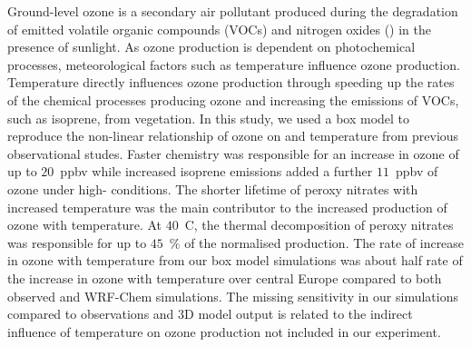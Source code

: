 Ground-level ozone is a secondary air pollutant produced during the degradation of emitted volatile organic compounds (VOCs) and nitrogen oxides () in the presence of sunlight. 
As ozone production is dependent on photochemical processes, meteorological factors such as temperature influence ozone production.
Temperature directly influences ozone production through speeding up the rates of the chemical processes producing ozone and increasing the emissions of VOCs, such as isoprene, from vegetation.
In this study, we used a box model to reproduce the non-linear relationship of ozone on  and temperature from previous observational studes.
Faster chemistry was responsible for an increase in ozone of up to $20$~ppbv while increased isoprene emissions added a further $11$~ppbv of ozone under high- conditions.
The shorter lifetime of peroxy nitrates with increased temperature was the main contributor to the increased production of ozone with temperature. 
At $40$~\degree C, the thermal decomposition of peroxy nitrates was responsible for up to $45$~\% of the normalised  production.
The rate of increase in ozone with temperature from our box model simulations was about half rate of the increase in ozone with temperature over central Europe compared to both observed and WRF-Chem simulations.
The missing sensitivity in our simulations compared to observations and 3D model output is related to the indirect influence of temperature on ozone production not included in our experiment.
